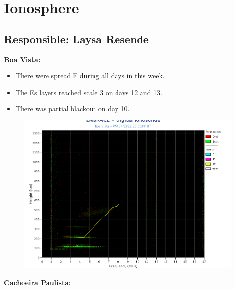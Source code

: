 \documentclass[a4paper, 10pt]{article}
\begin{document}
\section{Ionosphere} 
 \subsection{Responsible: Laysa Resende} 
 
\textbf{Boa Vista: }

 \begin{itemize}
\item There were spread F during all days in this week.
\item The Es layers reached scale 3 on days 12 and 13.
\item There was partial blackout on day 10. 
\end{itemize}
\begin{figure}[H]
    \centering
    \includegraphics[width=14cm]{./figures//BoaVista.png}
\end{figure}

\textbf{Cachoeira Paulista:}
\end{document}
